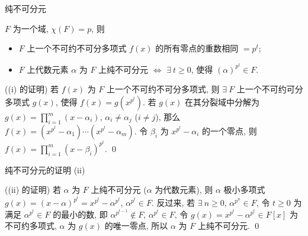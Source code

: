 
\begin{frame}{纯不可分元}

\begin{lem}[纯不可分元]
$F$ 为一个域, $\chi(F) = p$, 则
\begin{itemize}
\item[(i)] $F$ 上一个不可约不可分多项式 $f(x)$ 的所有零点的重数相同 $= p^t$;
\item[(ii)] $F$ 上代数元素 $\alpha$ 为 $F$ 上纯不可分元 $\iff$
  $\exists\ t \geq 0$, 使得 $(\alpha)^{p^t} \in F$.
\end{itemize}
\end{lem}

\startproof[bg=yellow, fg=red]((i) 的证明)
若 $f(x)$ 为 $F$ 上一个不可约不可分多项式,
则 $\exists\ F$ 上一个不可约可分多项式 $g(x)$, 使得 $f(x) = g(x^{p^t})$.
若 $g(x)$ 在其分裂域中分解为 $g(x) = \prod_{i=1}^{m} (x - \alpha_i)$,
$\alpha_i \neq \alpha_j$ ($i \neq j$),
那么 $f(x) = (x^{p^t} - \alpha_1) \dotsm (x^{p^t} - \alpha_m)$.
令 $\beta_i$ 为 $x^{p^t} - \alpha_i$ 的一个零点,
则 $f(x) = \prod_{i=1}^{m} (x - \beta_i)^{p^t}$.
\qed

\end{frame}


\begin{frame}{纯不可分元的证明 (ii)}

\startproof[bg=yellow, fg=red]((ii) 的证明)
若 $\alpha$ 为 $F$ 上纯不可分元 ($\alpha$ 为代数元素),
则 $\alpha$ 极小多项式 $g(x) = (x - \alpha)^{p^t} = x^{p^t} - \alpha^{p^t}$,
$\alpha^{p^t} \in F$.
反过来, 若 $\exists\ n \geq 0$, $\alpha^{p^n} \in F$,
令 $t \geq 0$ 为满足 $\alpha^{p^t} \in F$ 的最小的数,
即 $\alpha^{p^{t-1}} \notin F$, $\alpha^{p^t} \in F$,
令 $g(x) = x^{p^t} - \alpha^{p^t} \in F[x]$ 为不可约多项式,
$\alpha$ 为 $g(x)$ 的唯一零点, 所以 $\alpha$ 为 $F$ 上纯不可分元.
\qed

\end{frame}


